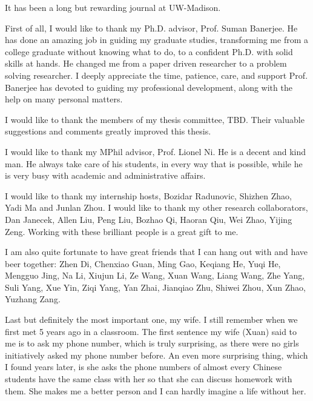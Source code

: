 \begin{acknowledgments}

It has been a long but rewarding journal at UW-Madison.

First of all, I would like to thank my Ph.D. advisor, Prof. Suman Banerjee. 
He has done an amazing job in guiding my graduate studies, transforming me
from a college graduate without knowing what to do, to a confident Ph.D. with
solid skills at hands. 
He changed me from a paper driven researcher to a problem solving researcher. 
I deeply appreciate the time, patience, care, 
and support Prof. Banerjee has devoted to guiding my professional
development, along with the help on many personal matters. 
 
I would like to thank the members of my thesis committee, TBD. 
Their valuable suggestions and comments greatly improved this thesis.
 
I would like to thank my MPhil advisor, Prof. Lionel Ni. 
He is a decent and kind man. 
He always take care of his students, in every way that is possible, 
while he is very busy with academic and administrative affairs. 


I would like to thank my internship hosts, Bozidar Radunovic, 
Shizhen Zhao, Yadi Ma and Junlan Zhou. I would like to thank 
my other research collaborators, 
Dan Janecek,
Allen Liu, Peng Liu, 
Bozhao Qi, Haoran Qiu,
Wei Zhao, Yijing Zeng.
Working with these brilliant people is a great gift to me. 

I am also quite fortunate to have great friends that I can hang out with and have
beer together: 
Zhen Di,
Chenxiao Guan, Ming Gao,
Keqiang He, Yuqi He,
Mengguo Jing,
Na Li, Xiujun Li,
Ze Wang, Xuan Wang, Liang Wang,
Zhe Yang, Suli Yang, Xue Yin, Ziqi Yang,
Yan Zhai, Jianqiao Zhu, Shiwei Zhou, Xun Zhao, Yuzhang Zang. 


Last but definitely the most important one, my wife.
I still remember when we first met 5 years ago in a classroom. 
The first sentence my wife (Xuan) said to me is to ask my phone number, 
which is truly surprising, as there were no girls initiatively asked my phone number before. 
An even more surprising thing, which I found years later, is she asks the 
phone numbers of almost every Chinese students have the same class with her 
so that she can discuss homework with them.
She makes me a better person and I can hardly imagine
a life without her. 


\end{acknowledgments}

